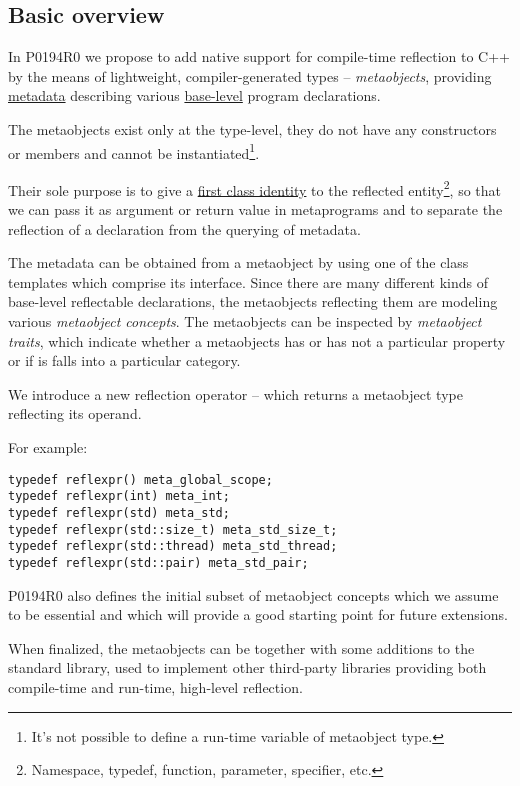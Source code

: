 \subsection{Basic overview}

In P0194R0 we propose to add native support for
compile-time reflection to C++ by the means of lightweight, compiler-generated
types -- {\em metaobjects}, providing \hyperref[term-metadata]{metadata}
describing various \hyperref[term-base-meta-level]{base-level} program declarations.

The metaobjects exist only at the type-level, they do not have any constructors
or members and cannot be instantiated\footnote{It's not possible to define
a run-time variable of metaobject type.}.

Their sole purpose is to give a \hyperref[term-first-class]{first class identity}
to the reflected entity\footnote{Namespace, typedef, function, parameter, specifier, etc.},
so that we can pass it as argument or return value in metaprograms and to
separate the reflection of a declaration from the querying of metadata.

The metadata can be obtained from a metaobject by using one of the class templates
which comprise its interface.
Since there are many different kinds of
base-level reflectable declarations, the metaobjects reflecting them are
modeling various {\em metaobject concepts}. The metaobjects can be inspected
by {\em metaobject traits}, which indicate whether a metaobjects has or has
not a particular property or if is falls into a particular category.

We introduce a new reflection operator -- \verb@reflexpr@ which returns a
metaobject type reflecting its operand.

For example:

\begin{verbatim}
typedef reflexpr() meta_global_scope;
typedef reflexpr(int) meta_int;
typedef reflexpr(std) meta_std;
typedef reflexpr(std::size_t) meta_std_size_t;
typedef reflexpr(std::thread) meta_std_thread;
typedef reflexpr(std::pair) meta_std_pair;
\end{verbatim}

P0194R0 also defines the initial subset
of metaobject concepts which we assume to be essential
and which will provide a good starting point for future extensions.

When finalized, the metaobjects can be together with some additions
to the standard library, used to implement other third-party libraries
providing both compile-time and run-time, high-level reflection.

